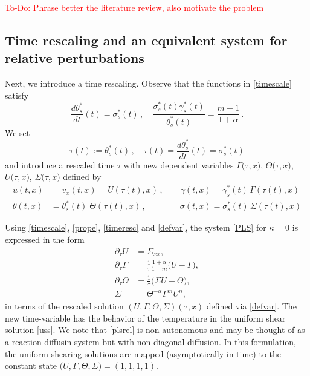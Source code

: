 \documentclass[a4paper,11pt]{article}
\newcommand{\tcr}{\textcolor{red}}
\theoremstyle{remark}
\begin{document}
\tcr{To-Do:  Phrase better the literature review, also motivate the problem}

\subsection{Time rescaling and an equivalent system for relative perturbations}
\label{sec:time}

Next, we introduce a time rescaling. Observe that the functions in \eqref{timescale} satisfy
\begin{equation}
\label{prope}
\frac{d \theta^*_s}{dt} (t) = \sigma^*_s (t)  \, , \quad \frac{\sigma^*_s (t) \gamma^*_s (t)}{\theta^*_s (t)} = \frac{m+1}{1+\alpha} \, .
\end{equation}
We set 
\begin{equation}
\label{timeresc}
\tau (t) := \theta^*_s(t) \, , \quad \dot \tau (t) = \frac{d \theta^*_s}{dt} (t) = \sigma^*_s (t)
\end{equation}
and introduce a rescaled time $\tau$ with new dependent variables 
$\Gamma\big(\tau,x\big)$, $\Theta\big(\tau,x\big)$, $U\big(\tau,x\big)$, $\Sigma\big(\tau,x\big)$ defined by 
\begin{equation}
\label{defvar}
 \begin{aligned}
 u (t, x) &= v_x (t, x) = U(\tau(t), x) \, , \qquad \gamma(t,x) = \gamma^*_s(t) \, \Gamma (\tau (t), x) 
 \\
\theta(t,x) &= \theta^*_s (t)  \; \Theta (\tau(t), x) \, , \qquad \qquad \sigma(t,x) = \sigma^*_s (t) \, \Sigma (\tau (t) , x)
\end{aligned}
\end{equation}


Using \eqref{timescale}, \eqref{prope}, \eqref{timeresc} and \eqref{defvar}, the system \eqref{PLS} for  $\kappa = 0$ is
expressed in the form
\begin{equation} \label{plsrel}
 \begin{aligned}
  \partial_\tau U &= \Sigma_{xx},\\
  \partial_\tau \Gamma &= \frac{1}{\tau}\frac{1+\alpha}{1+m} \Big(U-\Gamma\Big),\\
  \partial_\tau \Theta &= \frac{1}{\tau}\Big(\Sigma U - \Theta\Big), \\
  \Sigma&=\Theta^{-\alpha}\Gamma^m U^n,
 \end{aligned}
\end{equation}
in terms of the rescaled solution $(U, \Gamma, \Theta, \Sigma)(\tau, x)$ defined via \eqref{defvar}. The new time-variable has the
behavior of the temperature in the uniform shear solution \eqref{uss}.
We note that \eqref{plsrel} is non-autonomous and may be thought of as a reaction-diffusin system but with non-diagonal diffusion.
In this formulation, the uniform shearing solutions are mapped  (asymptotically in time) to the constant state 
$\big(U, \Gamma, \Theta,\Sigma \big)=(1,1,1,1)$. 
\end{document}

